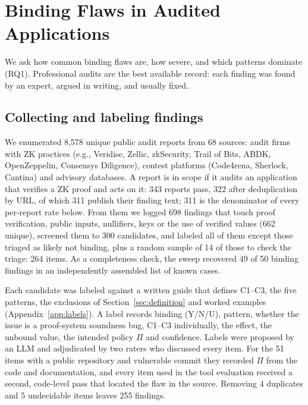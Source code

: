 \section{Binding Flaws in Audited Applications}\label{sec:study}

We ask how common binding flaws are, how severe, and which patterns dominate
(RQ1). Professional audits are the best available record: each finding was
found by an expert, argued in writing, and usually fixed.

\subsection{Collecting and labeling findings}\label{sec:study-collect}

We enumerated 8,578 unique public audit reports from 68 sources: audit firms
with ZK practices (e.g., Veridise, Zellic, zkSecurity, Trail of Bits, ABDK,
OpenZeppelin, Consensys Diligence), contest platforms (Code4rena, Sherlock,
Cantina) and advisory databases. A report is in scope if it audits an
application that verifies a ZK proof and acts on it: 343 reports pass, 322
after deduplication by URL, of which 311 publish their finding text; 311 is
the denominator of every per-report rate below. From them we logged 698
findings that touch proof verification, public inputs, nullifiers, keys or
the use of verified values (662 unique), screened them to 300 candidates, and
labeled all of them except those triaged as likely not binding, plus a random
sample of 14 of those to check the triage: 264 items. As a completeness
check, the sweep recovered 49 of 50 binding findings in an independently
assembled list of known cases.

Each candidate was labeled against a written guide that defines C1--C3, the
five patterns, the exclusions of Section~\ref{sec:definition} and worked
examples (Appendix~\ref{app:labels}). A label records binding (Y/N/U),
pattern, whether the issue is a proof-system soundness bug, C1--C3
individually, the effect, the unbound value, the intended policy $\Pi$ and
confidence. Labels were proposed by an LLM and adjudicated by two raters who
discussed every item. For the 51 items with a public repository and
vulnerable commit they recorded $\Pi$ from the code and documentation, and
every item used in the tool evaluation received a second, code-level pass
that located the flaw in the source.  Removing 4 duplicates and
5 undecidable items leaves 255 findings.

